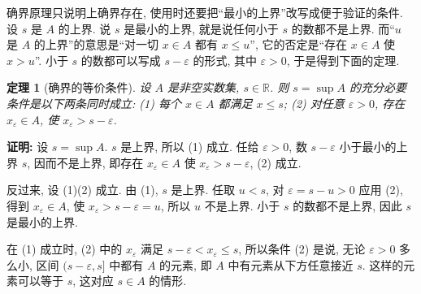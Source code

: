 \documentclass[UTF8,openany]{ctexbook}
\theoremstyle{chinesetextbook}
\newtheorem{theorem}{定理}[section]
\newenvironment{cnproof}{\par\indent\textbf{证明:} \ignorespaces}{\par}
\begin{document}
确界原理只说明上确界存在, 使用时还要把“最小的上界”改写成便于验证的条件. 设 $s$ 是 $A$ 的上界. 说 $s$ 是最小的上界, 就是说任何小于 $s$ 的数都不是上界. 而“$u$ 是 $A$ 的上界”的意思是“对一切 $x\in A$ 都有 $x\le u$”, 它的否定是“存在 $x\in A$ 使 $x>u$”. 小于 $s$ 的数都可以写成 $s-\varepsilon$ 的形式, 其中 $\varepsilon>0$, 于是得到下面的定理.
\begin{theorem}[确界的等价条件]
设 $A$ 是非空实数集, $s\in\mathbb R$. 则 $s=\sup A$ 的充分必要条件是以下两条同时成立: \textup{(1)} 每个 $x\in A$ 都满足 $x\le s$; \textup{(2)} 对任意 $\varepsilon>0$, 存在 $x_\varepsilon\in A$, 使 $x_\varepsilon>s-\varepsilon$.
\end{theorem}
\begin{cnproof}
设 $s=\sup A$. $s$ 是上界, 所以 (1) 成立. 任给 $\varepsilon>0$, 数 $s-\varepsilon$ 小于最小的上界 $s$, 因而不是上界, 即存在 $x_\varepsilon\in A$ 使 $x_\varepsilon>s-\varepsilon$, (2) 成立.

反过来, 设 (1)(2) 成立. 由 (1), $s$ 是上界. 任取 $u<s$, 对 $\varepsilon=s-u>0$ 应用 (2), 得到 $x_\varepsilon\in A$, 使 $x_\varepsilon>s-\varepsilon=u$, 所以 $u$ 不是上界. 小于 $s$ 的数都不是上界, 因此 $s$ 是最小的上界.
\end{cnproof}
在 (1) 成立时, (2) 中的 $x_\varepsilon$ 满足 $s-\varepsilon<x_\varepsilon\le s$, 所以条件 (2) 是说, 无论 $\varepsilon>0$ 多么小, 区间 $(s-\varepsilon,s]$ 中都有 $A$ 的元素, 即 $A$ 中有元素从下方任意接近 $s$. 这样的元素可以等于 $s$, 这对应 $s\in A$ 的情形.
\end{document}
